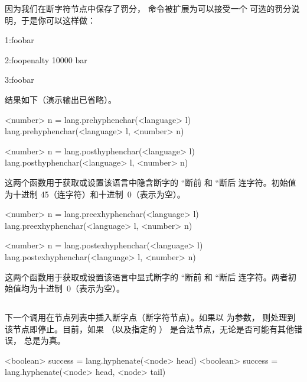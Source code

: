 因为我们在断字符节点中保存了罚分， 命令被扩展为可以接受一个
可选的罚分说明，于是你可以这样做：

\begin{typing}
1:foo{\discretionary{}{}{}}bar\par
2:foo\discretionary penalty 10000 {}{}{}bar\par
3:foo\discretionary{}{}{}bar\par
\end{typing}

结果如下（演示输出已省略）。


\begin{typing}
<number> n = lang.prehyphenchar(<language> l)
lang.prehyphenchar(<language> l, <number> n)

<number> n = lang.posthyphenchar(<language> l)
lang.posthyphenchar(<language> l, <number> n)
\end{typing}

这两个函数用于获取或设置该语言中隐含断字的 ``断前 和 ``断后
连字符。初始值为十进制 45（连字符）和十进制~0（表示为空）。

\begin{typing}
<number> n = lang.preexhyphenchar(<language> l)
lang.preexhyphenchar(<language> l, <number> n)

<number> n = lang.postexhyphenchar(<language> l)
lang.postexhyphenchar(<language> l, <number> n)
\end{typing}

这两个函数用于获取或设置该语言中显式断字的 ``断前 和 ``断后
连字符。两者初始值均为十进制~0（表示为空）。

\subsection {}


下一个调用在节点列表中插入断字点（断字符节点）。如果以  为参数，
则处理到该节点即停止。目前，如果 （以及指定的 ）
是合法节点，无论是否可能有其他错误， 总是为真。

\begin{typing}
<boolean> success = lang.hyphenate(<node> head)
<boolean> success = lang.hyphenate(<node> head, <node> tail)
\end{typing}


